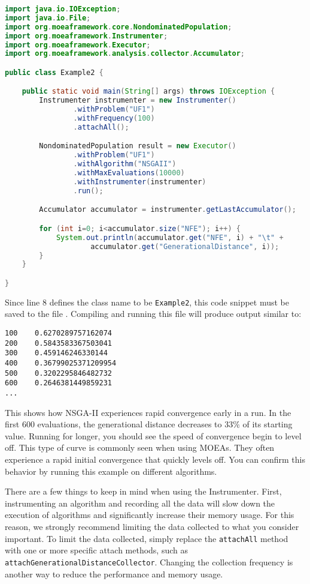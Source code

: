 \begin{lstlisting}[language=Java]
import java.io.IOException;
import java.io.File;
import org.moeaframework.core.NondominatedPopulation;
import org.moeaframework.Instrumenter;
import org.moeaframework.Executor;
import org.moeaframework.analysis.collector.Accumulator;

public class Example2 {

	public static void main(String[] args) throws IOException {
		Instrumenter instrumenter = new Instrumenter()
				.withProblem("UF1")
				.withFrequency(100)
				.attachAll();

		NondominatedPopulation result = new Executor()
				.withProblem("UF1")
				.withAlgorithm("NSGAII")
				.withMaxEvaluations(10000)
				.withInstrumenter(instrumenter)
				.run();

		Accumulator accumulator = instrumenter.getLastAccumulator();

		for (int i=0; i<accumulator.size("NFE"); i++) {
			System.out.println(accumulator.get("NFE", i) + "\t" +  
					accumulator.get("GenerationalDistance", i));
		}
	}

}
\end{lstlisting}

Since line 8 defines the class name to be \texttt{Example2}, this code snippet must be saved to the file .  Compiling and running this file will produce output similar to:

\begin{lstlisting}[language=Plaintext]
100    0.6270289757162074
200    0.5843583367503041
300    0.459146246330144
400    0.36799025371209954
500    0.3202295846482732
600    0.2646381449859231
...
\end{lstlisting}

This shows how NSGA-II experiences rapid convergence early in a run.  In the first 600 evaluations, the generational distance decreases to 33\% of its starting value.  Running for longer, you should see the speed of convergence begin to level off.  This type of curve is commonly seen when using MOEAs.  They often experience a rapid initial convergence that quickly levels off.  You can confirm this behavior by running this example on different algorithms.

\begin{tip}
There are a few things to keep in mind when using the Instrumenter. First, instrumenting an algorithm and recording all the data will slow down the execution of algorithms and significantly increase their memory usage.  For this reason, we strongly recommend limiting the data collected to what you consider important.  To limit the data collected, simply replace the \texttt{attachAll} method with one or more specific attach methods, such as \texttt{attachGenerationalDistanceCollector}.  Changing the collection frequency is another way to reduce the performance and memory usage.
\end{tip}

